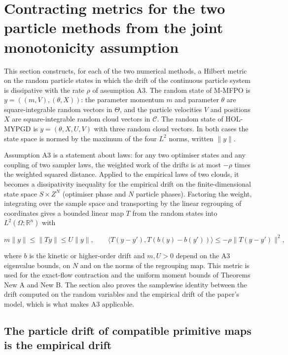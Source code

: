 \documentclass[11pt,a4paper]{report}
\begin{document}
\section{\texorpdfstring{Contracting metrics for the two particle methods from the joint monotonicity assumption}{Contracting metrics for the two particle methods from the joint monotonicity assumption}}


This section constructs, for each of the two numerical methods, a Hilbert metric on the random particle states in which the drift of the continuous particle system is dissipative with the rate \(\rho\) of assumption A3. The random state of M-MFPO is \(y=((m,V),(\theta,X))\): the parameter momentum \(m\) and parameter \(\theta\) are square-integrable random vectors in \(\Theta\), and the particle velocities \(V\) and positions \(X\) are square-integrable random cloud vectors in \(\mathcal C\). The random state of HOL-MYPGD is \(y=(\theta,X,U,V)\) with three random cloud vectors. In both cases the state space is normed by the maximum of the four \(L^2\) norms, written \(\|y\|\).




Assumption A3 is a statement about laws: for any two optimiser states and any coupling of two sampler laws, the weighted work of the drifts is at most \(-\rho\) times the weighted squared distance. Applied to the empirical laws of two clouds, it becomes a dissipativity inequality for the empirical drift on the finite-dimensional state space \(S\times Z^N\) (optimiser phase and \(N\) particle phases). Factoring the weight, integrating over the sample space and transporting by the linear regrouping of coordinates gives a bounded linear map \(T\) from the random states into \(L^2(\Omega;\mathbb R^n)\) with


\[m\|y\|\le\|Ty\|\le U\|y\|,\qquad\bigl\langle T(y-y'),T(b(y)-b(y'))\bigr\rangle\le-\rho\|T(y-y')\|^2,\]


where \(b\) is the kinetic or higher-order drift and \(m,U>0\) depend on the A3 eigenvalue bounds, on \(N\) and on the norms of the regrouping map. This metric is used for the exact-flow contraction and the uniform moment bounds of Theorems New A and New B. The section also proves the samplewise identity between the drift computed on the random variables and the empirical drift of the paper's model, which is what makes A3 applicable.

\subsection{\texorpdfstring{The particle drift of compatible primitive maps is the empirical drift}{The particle drift of compatible primitive maps is the empirical drift}}
\end{document}
